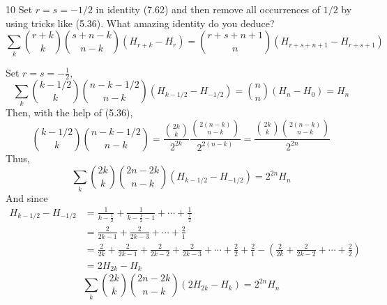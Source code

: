 \documentclass[a4paper,12pt]{article}
\makeatletter
\newtheorem*{solution}{Solution}
\theoremstyle{definition}
\renewenvironment{solution}[1][Solution] {\par\pushQED{\qed}\normalfont\topsep6\p@\@plus6\p@\relax\trivlist\item[\hskip\labelsep\bfseries#1\@addpunct{.}]\ignorespaces}{\popQED\endtrivlist\@endpefalse} \makeatother
\newenvironment{problems}{\begin{list}{}{\renewcommand{\makelabel}[1]{\textbf{##1}\hfil}}}{\end{list}}
\makeatother
\begin{document}
\begin{problems}
\begin{solution}
   \end{solution} 
   \item[10]  Set $r=s= -1/2$ in identity (7.62) and then remove all occurrences of $1/2$ by using tricks like (5.36).  What amazing identity do you deduce?
   \begin{equation*}
      \sum_k \binom{r+k}{k}\binom{s+n-k}{n-k}(H_{r+k}-H_r) = \binom{r+s+n+1}{n}(H_{r+s+n+1}-H_{r+s+1})
   \end{equation*}
   \begin{solution}
      Set $r=s=-\frac{1}{2}$,
      \begin{equation*}
         \sum_k \binom{k-1/2}{k}\binom{n-k-1/2}{n-k}(H_{k-1/2}-H_{-1/2}) = \binom{n}{n}(H_{n}-H_{0}) = H_n
      \end{equation*}
      Then, with the help of (5.36),
      \begin{equation*}
         \binom{k-1/2}{k}\binom{n-k-1/2}{n-k} = \frac{\binom{2k}{k}}{2^{2k}}\frac{\binom{2(n-k)}{n-k}}{2^{2(n-k)}} = \frac{\binom{2k}{k}\binom{2(n-k)}{n-k}}{2^{2n}}
      \end{equation*}
      Thus,
      \begin{equation*}
         \sum_k \binom{2k}{k}\binom{2n-2k}{n-k}(H_{k-1/2}-H_{-1/2}) = 2^{2n}H_n
      \end{equation*}
      And since
      \begin{align*}
         H_{k-1/2} - H_{-1/2} &= \frac{1}{k-\frac{1}{2}} + \frac{1}{k-\frac{1}{2}-1} + \cdots + \frac{1}{\frac{1}{2}} \\&= \frac{2}{2k-1}+\frac{2}{2k-3}+\cdots+\frac{2}{1} \\&= \frac{2}{2k} + \frac{2}{2k-1} + \frac{2}{2k-2} + \frac{2}{2k-3} + \cdots + \frac{2}{2} + \frac{2}{1} - \left(\frac{2}{2k}+\frac{2}{2k-2} + \cdots + \frac{2}{2}\right) \\
         &= 2H_{2k} - H_k
      \end{align*}
      \begin{equation*}
         \sum_k \binom{2k}{k}\binom{2n-2k}{n-k}(2H_{2k} - H_k) = 2^{2n}H_n
      \end{equation*}
   \end{solution}
\end{problems}
\end{document}
